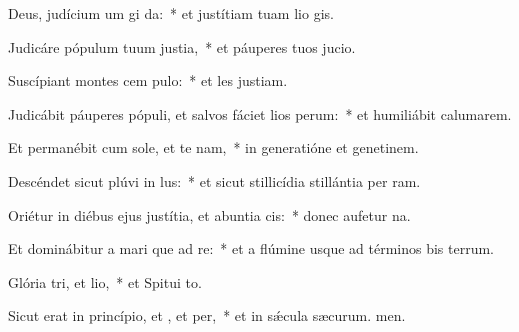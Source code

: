 \item Deus, judícium um gi da:~* et justítiam tuam lio gis.
\item Judicáre pópulum tuum  justia,~* et páuperes tuos  jucio.
\item Suscípiant montes cem pulo:~* et les justiam.
\item Judicábit páuperes pópuli, et salvos fáciet lios perum:~* et humiliábit calumarem.
\item Et permanébit cum sole, et te nam,~* in generatióne et genetinem.
\item Descéndet sicut plúvi in lus:~* et sicut stillicídia stillántia per ram.
\item Oriétur in diébus ejus justítia, et abuntia cis:~* donec aufetur na.
\item Et dominábitur a mari que ad re:~* et a flúmine usque ad términos bis terrum.
\item Glória tri, et lio,~* et Spitui to.
\item Sicut erat in princípio, et , et per,~* et in sǽcula sæcurum. men.
